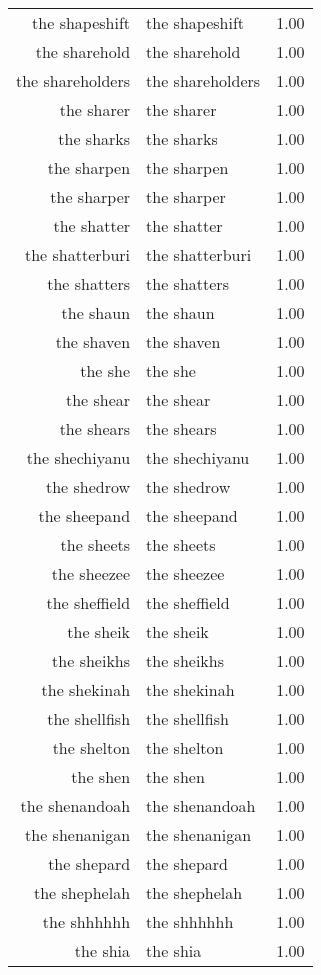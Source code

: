 \begin{table}[ht]
\begin{tabular}{rlr}
  the shapeshift & the shapeshift & 1.00 \\ 
  the sharehold & the sharehold & 1.00 \\ 
  the shareholders & the shareholders & 1.00 \\ 
  the sharer & the sharer & 1.00 \\ 
  the sharks & the sharks & 1.00 \\ 
  the sharpen & the sharpen & 1.00 \\ 
  the sharper & the sharper & 1.00 \\ 
  the shatter & the shatter & 1.00 \\ 
  the shatterburi & the shatterburi & 1.00 \\ 
  the shatters & the shatters & 1.00 \\ 
  the shaun & the shaun & 1.00 \\ 
  the shaven & the shaven & 1.00 \\ 
  the she & the she & 1.00 \\ 
  the shear & the shear & 1.00 \\ 
  the shears & the shears & 1.00 \\ 
  the shechiyanu & the shechiyanu & 1.00 \\ 
  the shedrow & the shedrow & 1.00 \\ 
  the sheepand & the sheepand & 1.00 \\ 
  the sheets & the sheets & 1.00 \\ 
  the sheezee & the sheezee & 1.00 \\ 
  the sheffield & the sheffield & 1.00 \\ 
  the sheik & the sheik & 1.00 \\ 
  the sheikhs & the sheikhs & 1.00 \\ 
  the shekinah & the shekinah & 1.00 \\ 
  the shellfish & the shellfish & 1.00 \\ 
  the shelton & the shelton & 1.00 \\ 
  the shen & the shen & 1.00 \\ 
  the shenandoah & the shenandoah & 1.00 \\ 
  the shenanigan & the shenanigan & 1.00 \\ 
  the shepard & the shepard & 1.00 \\ 
  the shephelah & the shephelah & 1.00 \\ 
  the shhhhhh & the shhhhhh & 1.00 \\ 
  the shia & the shia & 1.00 \\ 

\end{tabular}
\end{table}

